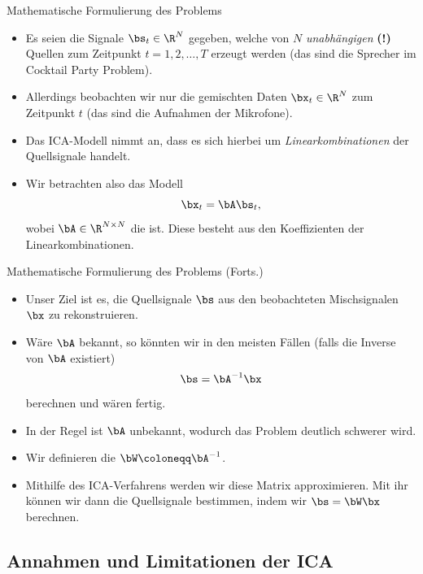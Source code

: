\begin{frame}{Mathematische Formulierung des Problems}{}
	\begin{itemize}
		\item Es seien die Signale $\bs_t \in \R^N$ gegeben, welche von $N$ \textit{unabhängigen} \textbf{(!)}
			Quellen zum Zeitpunkt $t = 1, 2, \ldots, T$ erzeugt werden (das sind die Sprecher im Cocktail Party Problem).
		\item Allerdings beobachten wir nur die gemischten Daten $\bx_t \in \R^N$ zum Zeitpunkt $t$
			(das sind die Aufnahmen der Mikrofone).
		\item Das ICA-Modell nimmt an, dass es sich hierbei um \textit{Linearkombinationen} der Quellsignale handelt.
		\item Wir betrachten also das Modell
		\begin{equation}
			\bx_t = \bA \bs_t,
		\end{equation}
		wobei $\bA \in \R^{N \times N}$ die  ist. Diese besteht aus den Koeffizienten der
		Linearkombinationen.
	\end{itemize}
\end{frame}


\begin{frame}{Mathematische Formulierung des Problems (Forts.)}{}
	\begin{itemize}
		\item Unser Ziel ist es, die Quellsignale $\bs$ aus den beobachteten Mischsignalen $\bx$ zu rekonstruieren.
		\item Wäre $\bA$ bekannt, so könnten wir in den meisten Fällen (falls die Inverse von $\bA$ existiert)
			$$\bs = \bA^{-1} \bx$$ berechnen und wären fertig.
		\item In der Regel ist $\bA$ unbekannt, wodurch das Problem deutlich schwerer wird.
		\item Wir definieren die  $\bW \coloneqq \bA^{-1}$.
		\item Mithilfe des ICA-Verfahrens werden wir diese Matrix approximieren.
			Mit ihr können wir dann die Quellsignale bestimmen, indem wir $\bs = \bW \bx$ berechnen.
	\end{itemize}
\end{frame}


\subsection{Annahmen und Limitationen der ICA}

